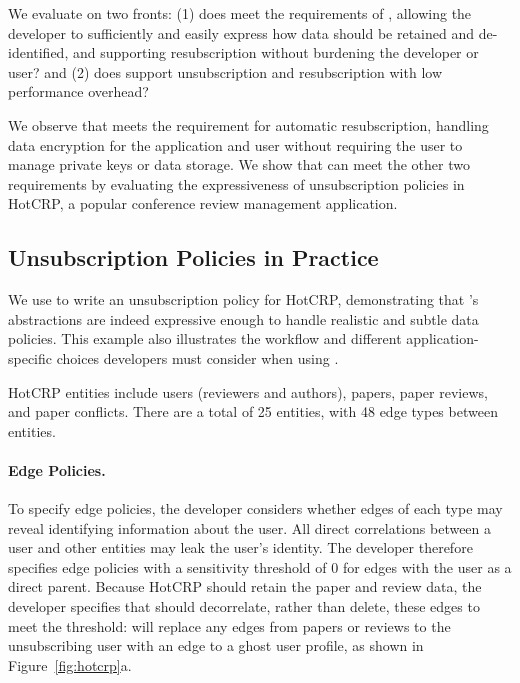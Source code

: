 We evaluate \sys on two fronts: (1) does \sys meet the requirements of \name,  
allowing the developer to sufficiently and easily express how data should be retained and
de-identified, and supporting resubscription without burdening the developer or user? and (2) 
does \sys support unsubscription and resubscription with low performance overhead?

We observe that \sys meets the requirement for automatic resubscription, handling
data encryption for the application and user without requiring the user to manage private keys or
data storage. We show that \sys can meet the other two requirements by evaluating the
expressiveness of unsubscription policies in HotCRP, a popular conference review management
application.

\subsection{Unsubscription Policies in Practice}
\label{sec:hotcrp_example}
We use \sys to write an unsubscription policy for HotCRP, demonstrating that \sys's abstractions
are indeed expressive enough to handle realistic and subtle data policies.  This example also
illustrates the workflow and different application-specific choices developers must consider when
using \sys. 

HotCRP entities include users (reviewers and authors), papers, paper reviews, and
paper conflicts. There are a total of 25 entities, with 48 edge types between entities.

\paragraph{Edge Policies.} 
To specify edge policies, the developer considers whether edges of each type may reveal identifying
information about the user.  All direct correlations between a user and other entities may leak the
user's identity. The developer therefore specifies edge policies with a sensitivity threshold of 0
for edges with the user as a direct parent.  Because HotCRP should retain the paper and review data,
the developer specifies that \sys should decorrelate, rather than delete, these edges to meet the
threshold: \sys will replace any edges from papers or reviews to the unsubscribing user with an edge
to a ghost user profile, as shown in Figure~\ref{fig:hotcrp}a.

